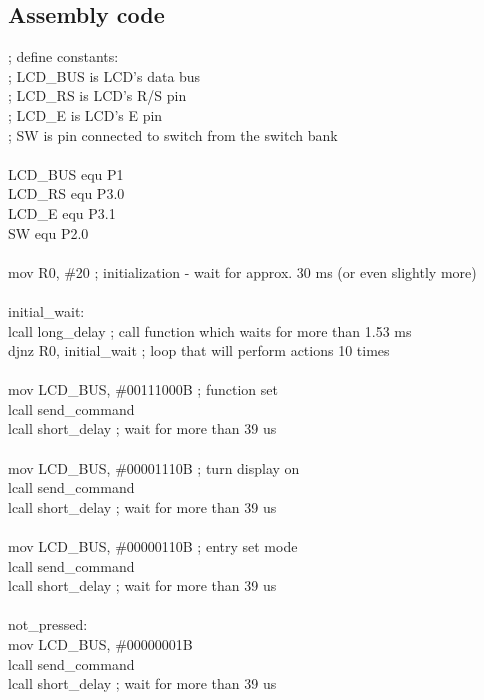 \documentclass{article}
\begin{document}
\subsection{Assembly code}
\ttfamily
; define constants: \\
; LCD\_BUS is LCD's data bus\\
; LCD\_RS is LCD's R/S pin\\
; LCD\_E is LCD's E pin\\
; SW is pin connected to switch from the switch bank\\
\\
LCD\_BUS     equ     P1\\
LCD\_RS      equ     P3.0\\
LCD\_E       equ     P3.1\\
SW          equ     P2.0\\
\\
mov     R0, \#20     ; initialization - wait for approx. 30 ms (or even slightly more)\\
\\
initial\_wait:\\
    lcall   long\_delay          ; call function which waits for more than 1.53 ms\\
    djnz    R0, initial\_wait    ; loop that will perform actions 10 times\\
\\
    mov     LCD\_BUS, \#00111000B ; function set\\
    lcall   send\_command\\
    lcall   short\_delay         ; wait for more than 39 us\\
\\
    mov     LCD\_BUS, \#00001110B ; turn display on\\
    lcall   send\_command\\
    lcall   short\_delay         ; wait for more than 39 us\\
\\
    mov     LCD\_BUS, \#00000110B ; entry set mode\\
    lcall   send\_command\\
    lcall   short\_delay         ; wait for more than 39 us\\
\\
not\_pressed:\\
    mov     LCD\_BUS, \#00000001B\\
    lcall   send\_command\\
    lcall   short\_delay         ; wait for more than 39 us\\
\end{document}
